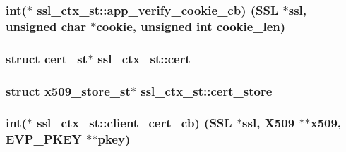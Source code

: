 \subsubsection[{\texorpdfstring{app\+\_\+verify\+\_\+cookie\+\_\+cb}{app_verify_cookie_cb}}]{\setlength{\rightskip}{0pt plus 5cm}int($\ast$ ssl\+\_\+ctx\+\_\+st\+::app\+\_\+verify\+\_\+cookie\+\_\+cb) ({\bf S\+SL} $\ast$ssl, unsigned char $\ast$cookie, unsigned int cookie\+\_\+len)}\hypertarget{structssl__ctx__st_ae4800a3da47080713f12d4d1ca51be16}{}\label{structssl__ctx__st_ae4800a3da47080713f12d4d1ca51be16}
\subsubsection[{\texorpdfstring{cert}{cert}}]{\setlength{\rightskip}{0pt plus 5cm}struct cert\+\_\+st$\ast$ ssl\+\_\+ctx\+\_\+st\+::cert}\hypertarget{structssl__ctx__st_a12fd74ab996b83c38cd73136a1163471}{}\label{structssl__ctx__st_a12fd74ab996b83c38cd73136a1163471}
\subsubsection[{\texorpdfstring{cert\+\_\+store}{cert_store}}]{\setlength{\rightskip}{0pt plus 5cm}struct {\bf x509\+\_\+store\+\_\+st}$\ast$ ssl\+\_\+ctx\+\_\+st\+::cert\+\_\+store}\hypertarget{structssl__ctx__st_a8b6658b3bc3acb20908f2541056e3949}{}\label{structssl__ctx__st_a8b6658b3bc3acb20908f2541056e3949}
\subsubsection[{\texorpdfstring{client\+\_\+cert\+\_\+cb}{client_cert_cb}}]{\setlength{\rightskip}{0pt plus 5cm}int($\ast$ ssl\+\_\+ctx\+\_\+st\+::client\+\_\+cert\+\_\+cb) ({\bf S\+SL} $\ast$ssl, {\bf X509} $\ast$$\ast$x509, {\bf E\+V\+P\+\_\+\+P\+K\+EY} $\ast$$\ast$pkey)}\hypertarget{structssl__ctx__st_a8e17061307de6d07b35e2563ef8ce550}{}\label{structssl__ctx__st_a8e17061307de6d07b35e2563ef8ce550}
